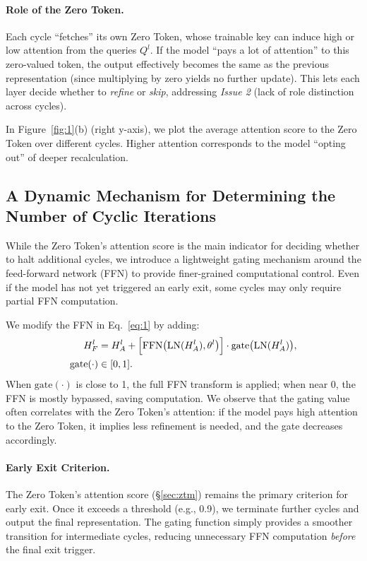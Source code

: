 \paragraph{Role of the Zero Token.}
Each cycle “fetches” its own Zero Token, whose trainable key can induce high or low attention from the queries $Q^l$. 
If the model “pays a lot of attention” to this zero-valued token, the output effectively becomes the same as the previous representation (since multiplying by zero yields no further update). 
This lets each layer decide whether to \emph{refine} or \emph{skip}, addressing \emph{Issue 2} (lack of role distinction across cycles).

In Figure~\ref{fig:1}(b) (right y-axis), we plot the average attention score to the Zero Token over different cycles. 
Higher attention corresponds to the model “opting out” of deeper recalculation.

\subsection{A Dynamic Mechanism for Determining the Number of Cyclic Iterations}
\label{sec:gating}

While the Zero Token's attention score is the main indicator for deciding whether to halt additional cycles, we introduce a lightweight gating mechanism around the feed-forward network (FFN) to provide finer-grained computational control. 
Even if the model has not yet triggered an early exit, some cycles may only require partial FFN computation.

We modify the FFN in Eq.~\ref{eq:1} by adding:
\begin{equation}
\label{eq:gating}
\begin{aligned}
H_F^l &= H_A^l 
+ \Bigl[\text{FFN}\bigl(\text{LN}(H_A^l), \theta^l\bigr)\Bigr] 
  \cdot \text{gate}\bigl(\text{LN}(H_A^l)\bigr),\\
\text{gate}(\cdot) &\in [0,1].
\end{aligned}
\end{equation}
When $\text{gate}(\cdot)$ is close to 1, the full FFN transform is applied; when near 0, the FFN is mostly bypassed, saving computation. 
We observe that the gating value often correlates with the Zero Token’s attention: if the model pays high attention to the Zero Token, it implies less refinement is needed, and the gate decreases accordingly.

\paragraph{Early Exit Criterion.}
The Zero Token’s attention score (\S\ref{sec:ztm}) remains the primary criterion for early exit. 
Once it exceeds a threshold (e.g., 0.9), we terminate further cycles and output the final representation. 
The gating function simply provides a smoother transition for intermediate cycles, reducing unnecessary FFN computation \emph{before} the final exit trigger.

